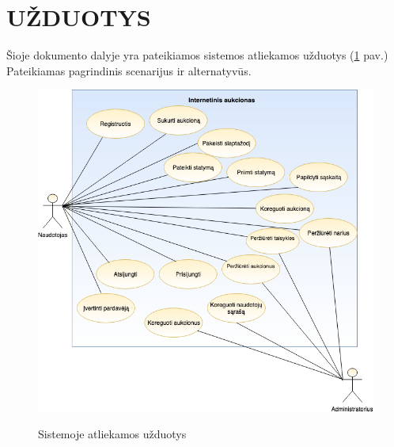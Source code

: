 \documentclass{VUMIFPSkursinis}
\begin{document}
	\newpage
	\newpage
	\section{UŽDUOTYS}
	Šioje dokumento dalyje yra pateikiamos sistemos atliekamos užduotys  (\ref{fig:usecase} pav.) Pateikiamas pagrindinis scenarijus ir alternatyvūs.
	\begin{figure}[H]
		\centering
		\includegraphics[width=\linewidth]{img/UseCaseDiagram.png}
		\label{fig:usecase}
		\caption{Sistemoje atliekamos užduotys}
	\end{figure}
	
\end{document}
